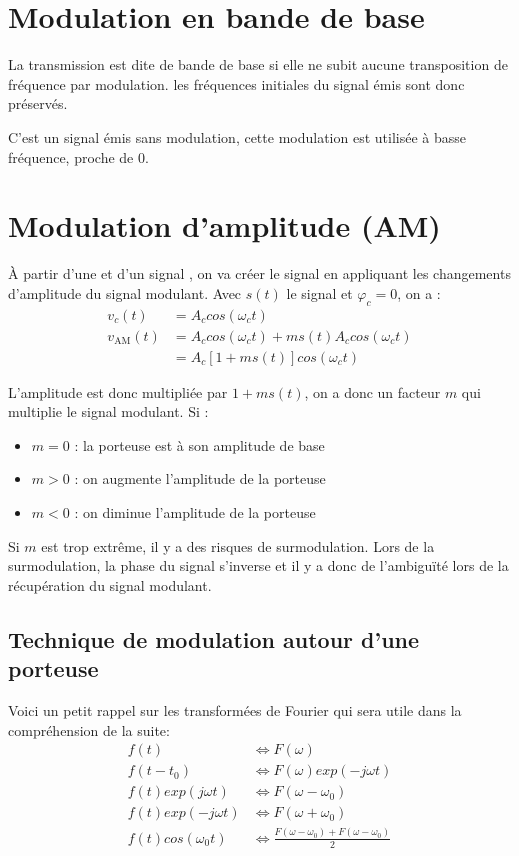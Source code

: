 \section{Modulation en bande de base}

La transmission est dite de bande de base si elle ne subit aucune transposition de fréquence par modulation. les fréquences initiales du signal émis sont donc préservés.

C'est un signal émis sans modulation, cette modulation est utilisée à basse fréquence, proche de 0.

\section{Modulation d'amplitude (AM)}

À partir d'une  et d'un signal , on va créer le signal  en appliquant les changements d'amplitude du signal modulant. Avec $s(t)$ le signal et $\varphi_c = 0$, on a :
\begin{align*}
v_c(t) &= A_c cos(\omega_c t)\\
v_{\text{AM}}(t) &= A_c cos(\omega_c t) + ms(t)A_c cos(\omega_c t)\\
	&= A_c[1 + ms(t)]cos(\omega_c t)
\end{align*}

L'amplitude est donc multipliée par $1+ms(t)$, on a donc un facteur $m$ qui multiplie le signal modulant. Si :
\begin{itemize}
\item $m = 0$ : la porteuse est à son amplitude de base
\item $m > 0$ : on augmente l'amplitude de la porteuse
\item $m < 0$ : on diminue l'amplitude de la porteuse
\end{itemize}
Si $m$ est trop extrême, il y a des risques de surmodulation. Lors de la surmodulation, la phase du signal s'inverse et il y a donc de l’ambiguïté lors de la récupération du signal modulant.

\newpage
\subsection{Technique de modulation autour d'une porteuse}

Voici un petit rappel sur les transformées de Fourier qui sera utile dans la compréhension de la suite:
\begin{align*}
f(t) &\Leftrightarrow F(\omega)\\
f(t-t_0) &\Leftrightarrow F(\omega)exp(-j\omega t)\\
f(t) exp(j\omega t) &\Leftrightarrow F(\omega-\omega_0)\\
f(t) exp(-j\omega t)&\Leftrightarrow F(\omega+\omega_0)\\
f(t) cos(\omega_0 t) &\Leftrightarrow \frac{F(\omega-\omega_0) +F(\omega-\omega_0)}{2}
\end{align*}

